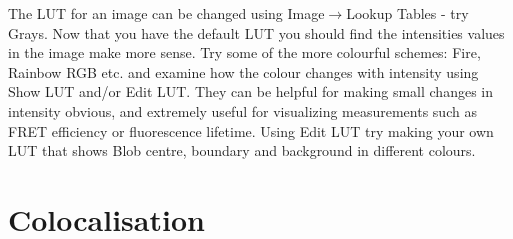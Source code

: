\documentclass[a4paper,oneside,article]{memoir}
\begin{document}
\begin{enumerate}[(a)]
      The LUT for an image can be changed using
      Image$\rightarrow$Lookup Tables - try Grays. Now that you have the
      default LUT you should find the intensities values in the image
      make more sense. Try some of the more colourful schemes: Fire,
      Rainbow RGB etc. and examine how the colour changes with intensity
      using Show LUT and/or Edit LUT. They can be helpful for making
      small changes in intensity obvious, and extremely useful for
      visualizing measurements such as FRET efficiency or fluorescence
      lifetime. Using Edit LUT try making your own LUT that shows Blob
      centre, boundary and background in different colours.
    \end{enumerate}

  \chapter{Colocalisation}
\end{document}

